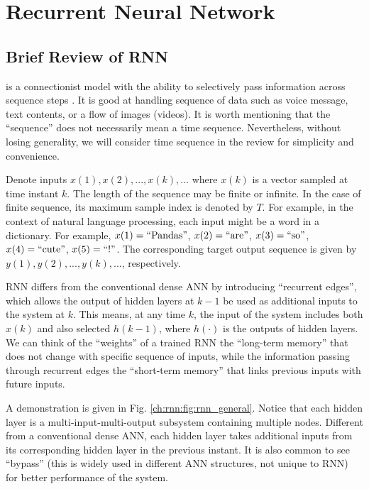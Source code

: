 \chapter{Recurrent Neural Network} \label{ch:rnn}

\section{Brief Review of RNN}

 is a connectionist model with the ability to selectively pass information across sequence steps \cite{lipton2015critical}. It is good at handling sequence of data such as voice message, text contents, or a flow of images (videos). It is worth mentioning that the ``sequence'' does not necessarily mean a time sequence. Nevertheless, without losing generality, we will consider time sequence in the review for simplicity and convenience.

Denote inputs $x(1), x(2), ..., x(k), ...$ where $x(k)$ is a vector sampled at time instant $k$. The length of the sequence may be finite or infinite. In the case of finite sequence, its maximum sample index is denoted by $T$. For example, in the context of natural language processing, each input might be a word in a dictionary. For example, $x(1) = \textup{``Pandas''}$, $x(2)=\textup{``are''}$, $x(3)=\textup{``so''}$, $x(4)=\textup{``cute''}$, $x(5)=\textup{``!''}$. The corresponding target output sequence is given by $y(1), y(2), ..., y(k), ...$, respectively.

RNN differs from the conventional dense ANN by introducing ``recurrent edges'', which allows the output of hidden layers at $k-1$ be used as additional inputs to the system at $k$. This means, at any time $k$, the input of the system includes both $x(k)$ and also selected $h(k-1)$, where $h(\cdot)$ is the outputs of hidden layers. We can think of the ``weights'' of a trained RNN the ``long-term memory'' that does not change with specific sequence of inputs, while the information passing through recurrent edges the ``short-term memory'' that links previous inputs with future inputs.

A demonstration is given in Fig. \ref{ch:rnn:fig:rnn_general}. Notice that each hidden layer is a multi-input-multi-output subsystem containing multiple nodes. Different from a conventional dense ANN, each hidden layer takes additional inputs from its corresponding hidden layer in the previous instant. It is also common to see ``bypass'' (this is widely used in different ANN structures, not unique to RNN) for better performance of the system.

